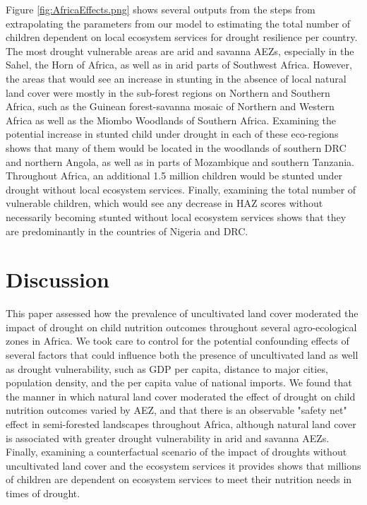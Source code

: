 \documentclass{article}
\begin{document}
Figure \ref{fig:AfricaEffects.png} shows several outputs from the steps from extrapolating the parameters from our model to estimating the total number of children dependent on local ecosystem services for drought resilience per country.  The most drought vulnerable areas are arid and savanna AEZs, especially in the Sahel, the Horn of Africa, as well as in arid parts of Southwest Africa.  However, the areas that would see an increase in stunting in the absence of local natural land cover were mostly in the sub-forest regions on Northern and Southern Africa, such as the Guinean forest-savanna mosaic of Northern and Western Africa as well as the Miombo Woodlands of Southern Africa. Examining the potential increase in stunted child under drought in each of these eco-regions shows that many of them would be located in the woodlands of southern DRC and northern Angola, as well as in parts of Mozambique and southern Tanzania.  Throughout Africa, an additional 1.5 million children would be stunted under drought without local ecosystem services.  Finally, examining the total number of vulnerable children, which would see any decrease in HAZ scores without necessarily becoming stunted without local ecosystem services shows that they are predominantly in the countries of Nigeria and DRC.

\section{Discussion}

This paper assessed how the prevalence of uncultivated land cover moderated the impact of drought on child nutrition outcomes throughout several agro-ecological zones in Africa.  We took care to control for the potential confounding effects of several factors that could influence both the presence of uncultivated land as well as drought vulnerability, such as GDP per capita, distance to major cities, population density, and the per capita value of national imports.  We found that the manner in which natural land cover moderated the effect of drought on child nutrition outcomes varied by AEZ, and that there is an observable "safety net" effect in semi-forested landscapes throughout Africa, although natural land cover is associated with greater drought vulnerability in arid and savanna AEZs.  Finally, examining a counterfactual scenario of the impact of droughts without uncultivated land cover and the ecosystem services it provides shows that millions of children are dependent on ecosystem services to meet their nutrition needs in times of drought.
\end{document}
